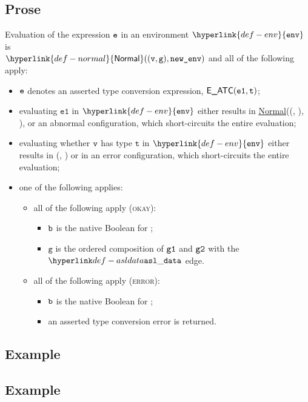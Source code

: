 \documentclass{book}
\newcommand\ProseOrAbnormal[0]{or an abnormal configuration, which short-circuits the entire evaluation}
\newcommand\Normal[0]{\hyperlink{def-normal}{\textsf{Normal}}}
\newcommand\env[0]{\hyperlink{def-env}{\texttt{env}}}
\newcommand\vg[0]{\texttt{g}}
\newcommand\vt[0]{\texttt{t}}
\newcommand\veone[0]{\texttt{e1}}
\begin{document}
  \subsection{Prose}
  Evaluation of the expression $\texttt{e}$ in an environment $\env$ is \\
  $\Normal((\vv, \vg), \newenv)$ and all of the following apply:
  \begin{itemize}
  \item $\texttt{e}$ denotes an asserted type conversion expression, $\EATC(\veone, \vt)$;
  \item evaluating $\veone$ in $\env$ either results in \Normal((\vv, \vgone), \newenv),
  \ProseOrAbnormal;
  \item evaluating whether $\texttt{v}$ has type $\vt$ in $\env$ either results in (\vb, \vgtwo)
  or in an error configuration, which short-circuits the entire evaluation;
  \item one of the following applies:
        \begin{itemize}
        \item all of the following apply (\textsc{okay}):
              \begin{itemize}
              \item $\texttt{b}$ is the native Boolean for \True;
              \item $\vg$ is the ordered composition of $\texttt{g1}$ and $\texttt{g2}$ with the $\asldata$ edge.
              \end{itemize}
        \item all of the following apply (\textsc{error}):
              \begin{itemize}
              \item $\texttt{b}$ is the native Boolean for \True;
              \item an asserted type conversion error is returned.
              \end{itemize}
        \end{itemize}
  \end{itemize}

  \subsection{Example}

  \subsection{Example}
\end{document}
